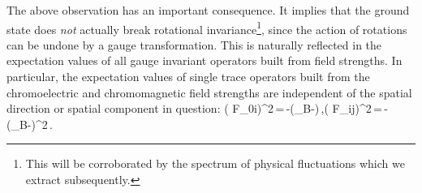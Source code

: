 The above observation has an important consequence. It implies that the ground state does {\em not} actually break rotational invariance\footnote{This will be corroborated by the spectrum of physical fluctuations which we extract subsequently.}, since the action of  rotations can be undone by  a gauge transformation. This is naturally reflected in the expectation values of all gauge invariant operators built from field strengths. In particular, the expectation values of single trace operators built from the chromoelectric and chromomagnetic field strengths are independent of the spatial direction or spatial component in question:
\be
{}\left( F_{0i}\right)^{2}\rangle\,=\,-\left(\mu_B-\right)\,,\qquad {}\left( F_{ij}\right)^{2}\rangle\,=\,-\left(\mu_B-\right)^2\,.
\ee


